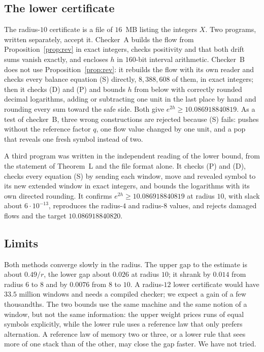 \subsection{The lower certificate}

The radius-$10$ certificate is a file of $16$~MB listing the integers $X$. Two programs, written separately, accept
it. Checker~A builds the flow from Proposition~\ref{prop:rev} in exact integers, checks positivity and that both drift
sums vanish exactly, and encloses $h$ in $160$-bit interval arithmetic. Checker~B does not use
Proposition~\ref{prop:rev}: it rebuilds the flow with its own reader and checks every balance equation (S) directly,
$8{,}388{,}608$ of them, in exact integers; then it checks (D) and (P) and bounds $h$ from below with correctly
rounded decimal logarithms, adding or subtracting one unit in the last place by hand and rounding every sum toward the
safe side. Both give $e^{2h}\ge10.086918840819$. As a test of checker~B, three wrong constructions are rejected
because (S) fails: pushes without the reference factor $q$, one flow value changed by one unit, and a pop that reveals
one fresh symbol instead of two.

A third program was written in the independent reading of the lower bound, from the statement of Theorem~L and the
file format alone. It checks (P) and (D), checks every equation (S) by sending each window, move and revealed symbol
to its new extended window in exact integers, and bounds the logarithms with its own directed rounding. It confirms
$e^{2h}\ge10.086918840819$ at radius $10$, with slack about $6\cdot10^{-13}$, reproduces the radius-$4$ and radius-$8$
values, and rejects damaged flows and the target $10.086918840820$.

\subsection{Limits}

Both methods converge slowly in the radius. The upper gap to the estimate is about $0.49/r$, the lower gap about
$0.026$ at radius $10$; it shrank by $0.014$ from radius $6$ to $8$ and by $0.0076$ from $8$ to $10$. A radius-$12$
lower certificate would have
$33.5$ million windows and needs a compiled checker; we expect a gain of a few thousandths. The two bounds use the
same machine and the same notion of a window, but not the same information: the upper weight prices runs of equal
symbols explicitly, while the lower rule uses a reference law that only prefers alternation. A reference law of memory
two or three, or a lower rule that sees more of one stack than of the other, may close the gap faster. We have not
tried.
